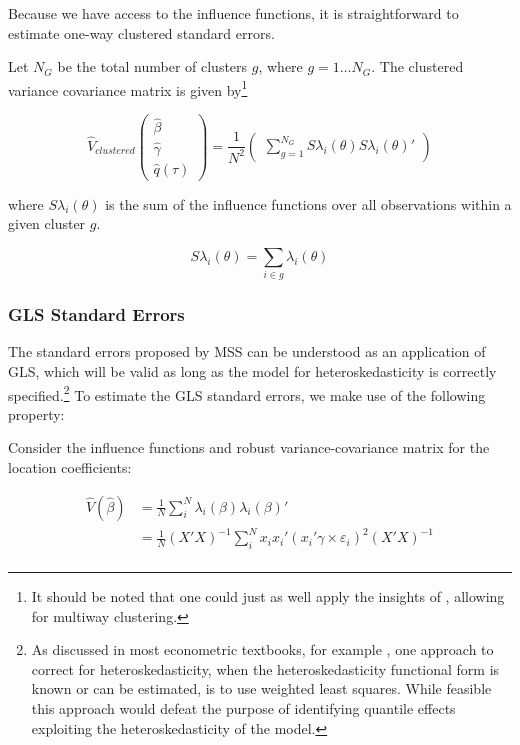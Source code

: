 \documentclass[
  authoryear,
  review,
  1p]{elsarticle}
\begin{document}
Because we have access to the influence functions, it is straightforward
to estimate one-way clustered standard errors.

Let \(N_G\) be the total number of clusters \(g\), where
\(g=1\dots N_G\). The clustered variance covariance matrix is given
by\footnote{It should be noted that one could just as well apply the
  insights of \citet{cameron_robust_2011}, allowing for multiway
  clustering.}

\[\hat{V}_{clustered}
  \begin{pmatrix}
  \hat\beta \\
  \hat\gamma \\
  \hat q(\tau)
  \end{pmatrix}
 = \frac{1}{N^2} 
 \begin{pmatrix}
 \sum_{g=1}^{N_G} S\lambda_i(\theta) S\lambda_i(\theta)'
  \end{pmatrix}
\]

where \(S\lambda_i(\theta)\) is the sum of the influence functions over
all observations within a given cluster \(g\).

\[S\lambda_i(\theta) = \sum_{i\in g} \lambda_i(\theta)
\]

\hypertarget{gls-standard-errors}{%
\subsubsection{GLS Standard Errors}\label{gls-standard-errors}}

The standard errors proposed by MSS can be understood as an application
of GLS, which will be valid as long as the model for heteroskedasticity
is correctly specified.\footnote{As discussed in most econometric
  textbooks, for example \citet{cameron2005}, one approach to correct
  for heteroskedasticity, when the heteroskedasticity functional form is
  known or can be estimated, is to use weighted least squares. While
  feasible this approach would defeat the purpose of identifying
  quantile effects exploiting the heteroskedasticity of the model.} To
estimate the GLS standard errors, we make use of the following property:

Consider the influence functions and robust variance-covariance matrix
for the location coefficients:

\[\begin{aligned}
\hat V(\hat \beta) &= \frac{1}{N} \sum_i^N \lambda_{i}(\beta) \lambda_{i}(\beta)' \\
&= \frac{1}{N}  (X'X)^{-1}  \sum_i^N x_i x_i' ( x_i'\gamma \times \varepsilon_i)^2 (X'X)^{-1} \\
\end{aligned}
\]
\end{document}
